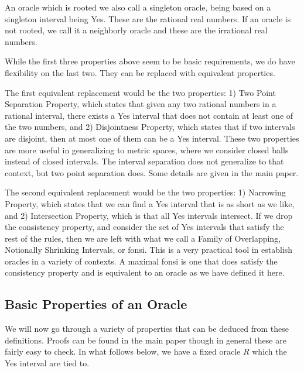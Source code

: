 \documentclass[12pt]{article}
\theoremstyle{remark}
\begin{document}
An oracle which is rooted we also call a singleton oracle, being based on a singleton interval being Yes. These are the rational real numbers. If an oracle is not rooted, we call it a neighborly oracle and these are the irrational real numbers. 

While the first three properties above seem to be basic requirements, we do have flexibility on the last two. They can be replaced with equivalent properties.

The first equivalent replacement would be the two properties: 1) Two Point Separation Property, which states that given any two rational numbers in a rational interval, there exists a Yes interval that does not contain at least one of the two numbers, and 2) Disjointness Property, which states that if two intervals are disjoint, then at most one of them can be a Yes interval. These two properties are more useful in generalizing to metric spaces, where we consider closed balls instead of closed intervals. The interval separation does not generalize to that context, but two point separation does. Some details are given in the main paper. 

The second equivalent replacement would be the two properties: 1) Narrowing Property, which states that we can find a Yes interval that is as short as we like, and 2) Intersection Property, which is that all Yes intervals intersect. If we drop the consistency property, and consider the set of Yes intervals that satisfy the rest of the rules, then we are left with what we call a Family of Overlapping, Notionally Shrinking Intervals, or fonsi. This is a very practical tool in establish oracles in a variety of contexts. A maximal fonsi is one that does satisfy the consistency property and is equivalent to an oracle as we have defined it here. 


\subsection{Basic Properties of an Oracle}

We will now go through a variety of properties that can be deduced from these definitions. Proofs can be found in the main paper though in general these are fairly easy to check. In what follows below, we have a fixed oracle $R$ which the Yes interval are tied to.
\end{document}
